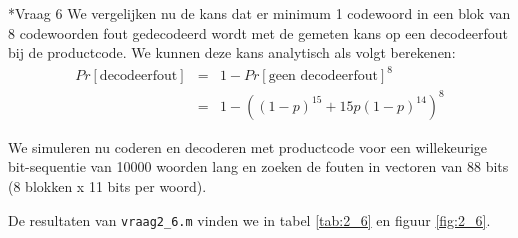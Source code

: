 \documentclass[]{article}
\begin{document}
\begin{section}
\begin{subsection}
    \end{subsection}

    \begin{subsection}*{Vraag 6} %
        We vergelijken nu de kans dat er minimum 1 codewoord in een
        blok van 8 codewoorden fout gedecodeerd wordt met de gemeten
        kans op een decodeerfout bij de productcode. We kunnen deze
        kans analytisch als volgt berekenen:
        \begin{eqnarray*}
            Pr[\text{decodeerfout}]
                &=& 1 - Pr[\text{geen decodeerfout}]^8 \\ 
                &=& 1 - ((1-p)^{15} + 15p(1-p)^{14})^8
        \end{eqnarray*}

        We simuleren nu coderen en decoderen met productcode voor een
        willekeurige bit-sequentie van 10000 woorden lang en zoeken de
        fouten in vectoren van 88 bits (8 blokken x 11 bits per woord).
        
        De resultaten van \texttt{vraag2\_6.m} vinden we in tabel
        \ref{tab:2_6} en figuur \ref{fig:2_6}.


\end{subsection}
\end{section}
\end{document}
